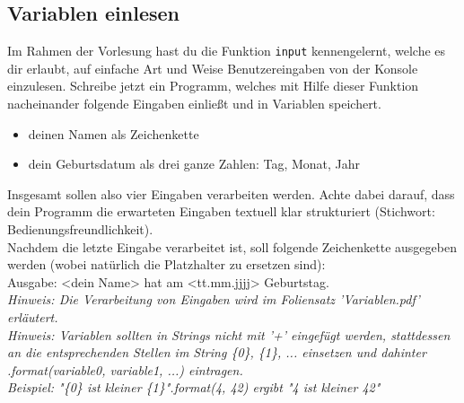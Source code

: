 \subsection{Variablen einlesen}
Im Rahmen der Vorlesung hast du die Funktion \texttt{input} kennengelernt, welche es dir erlaubt, auf einfache Art und Weise Benutzereingaben von der Konsole einzulesen. Schreibe jetzt ein Programm, welches mit Hilfe dieser Funktion nacheinander folgende Eingaben einließt und in Variablen speichert. 
\begin{itemize}
	\item deinen Namen als Zeichenkette
	\item dein Geburtsdatum als drei ganze Zahlen: Tag, Monat, Jahr
\end {itemize}
Insgesamt sollen also vier Eingaben verarbeiten werden. Achte dabei darauf, dass dein Programm die erwarteten Eingaben textuell klar strukturiert (Stichwort: Bedienungsfreundlichkeit).\\Nachdem die letzte Eingabe verarbeitet ist, soll folgende Zeichenkette ausgegeben werden (wobei natürlich die Platzhalter zu ersetzen sind):\\Ausgabe: {\ttfamily{\dq}}<dein Name> hat am <tt.mm.jjjj> Geburtstag.{\ttfamily{\dq}}
\\\textit{Hinweis: Die Verarbeitung von Eingaben wird im Foliensatz 'Variablen.pdf' erläutert.}
\\\textit{Hinweis: Variablen sollten in Strings nicht mit '+' eingefügt werden, stattdessen an die entsprechenden Stellen im String \{0\}, \{1\}, ... einsetzen und dahinter .format(variable0, variable1, ...) eintragen. \\
Beispiel: "\{0\} ist kleiner \{1\}".format(4, 42) ergibt "4 ist kleiner 42"}
